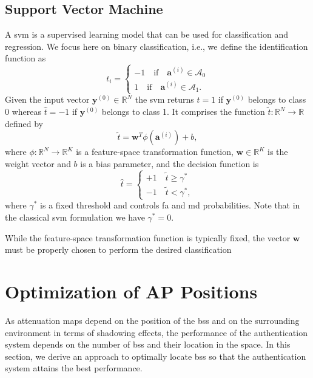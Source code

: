 \documentclass[twocolumns]{IEEEtran}
\begin{document}
\subsection{Support Vector Machine}\label{sec:svm}
A \ac{svm} \cite{Bishop2006} is a supervised learning model that can be used for classification and regression. We focus here on binary classification, i.e., we define the identification function as
\begin{equation}
  t_i =
  \begin{cases}
  -1 \quad \text{if} \quad \bm{a}^{(i)} \in \mathcal{A}_0\\
  1 \quad \text{if} \quad \bm{a}^{(i)} \in \mathcal{A}_1.
  \end{cases}
\end{equation}
Given the input vector $\bm{y}^{(0)} \in \mathbb{R}^N$ the \ac{svm} returns $\hat{t} = 1$ if $\bm{y}^{(0)}$ belongs to class 0 whereas $\hat{t}=-1$ if $\bm{y}^{(0)}$ belongs to class 1. It comprises the function $\tilde{t}: \mathbb{R}^N \to \mathbb{R}$ defined by
\begin{equation}
\label{eq:svm}
\tilde{t} = \mathbf{w}^T \phi (\mathbf{a}^{(i)}) + b,
\end{equation}
where $\phi: \mathbb{R}^N \to \mathbb{R}^K$ is a feature-space transformation function, $\mathbf{w} \in \mathbb{R}^K$ is the weight vector and $b$ is a bias parameter, and the decision function is
\begin{equation}
\label{eq:cases}
\hat{t} = 
\begin{cases}
+1 \quad \tilde{t}  \geq \gamma^* \\
-1 \quad \tilde{t}  < \gamma^*,
\end{cases}		
\end{equation} 
where $\gamma^*$ is a fixed threshold and controls \ac{fa} and \ac{md} probabilities. Note that in the classical \ac{svm} formulation we have $\gamma^* = 0$.

While the feature-space transformation function is typically fixed, the vector $\mathbf{w}$ must be properly chosen to perform the desired classification


\section{Optimization of AP Positions}\label{sec:bsPos}



As attenuation maps depend on the position of the \acp{bs} and on the surrounding environment in terms of shadowing effects, the performance of the authentication system depends on the number of \acp{bs} and their location in the space. In this section, we derive an approach to optimally locate \acp{bs} so that the authentication system attains the best performance. 
\end{document}
